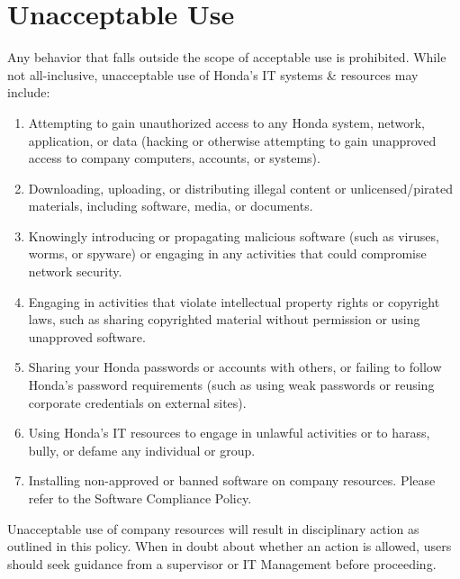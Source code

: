 \section{Unacceptable Use}
Any behavior that falls outside the scope of acceptable use is prohibited. While not all-inclusive, unacceptable use of Honda's IT systems \& resources may include:
\begin{enumerate}
    \item Attempting to gain unauthorized access to any Honda system, network, application, or data (hacking or otherwise attempting to gain unapproved access to company computers, accounts, or systems).
    \item Downloading, uploading, or distributing illegal content or unlicensed/pirated materials, including software, media, or documents.
    \item Knowingly introducing or propagating malicious software (such as viruses, worms, or spyware) or engaging in any activities that could compromise network security.
    \item Engaging in activities that violate intellectual property rights or copyright laws, such as sharing copyrighted material without permission or using unapproved software.
    \item Sharing your Honda passwords or accounts with others, or failing to follow Honda's password requirements (such as using weak passwords or reusing corporate credentials on external sites).
    \item Using Honda's IT resources to engage in unlawful activities or to harass, bully, or defame any individual or group.
    \item Installing non-approved or banned software on company resources. Please refer to the Software Compliance Policy. 
\end{enumerate}
Unacceptable use of company resources will result in disciplinary action as outlined in this policy. When in doubt about whether an action is allowed, users should seek guidance from a supervisor or IT Management before proceeding.

